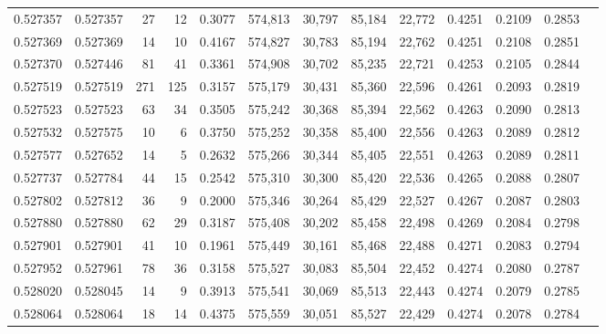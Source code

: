 \begin{tabular}{rrrrrrrrrrrrr}
0.527357 & 0.527357 &    27 &    12 &                                     0.3077 & 574,813 &  30,797 &  85,184 &  22,772 & 0.4251 & 0.2109 & 0.2853 \\
0.527369 & 0.527369 &    14 &    10 &                                     0.4167 & 574,827 &  30,783 &  85,194 &  22,762 & 0.4251 & 0.2108 & 0.2851 \\
0.527370 & 0.527446 &    81 &    41 &                                     0.3361 & 574,908 &  30,702 &  85,235 &  22,721 & 0.4253 & 0.2105 & 0.2844 \\
0.527519 & 0.527519 &   271 &   125 &                                     0.3157 & 575,179 &  30,431 &  85,360 &  22,596 & 0.4261 & 0.2093 & 0.2819 \\
0.527523 & 0.527523 &    63 &    34 &                                     0.3505 & 575,242 &  30,368 &  85,394 &  22,562 & 0.4263 & 0.2090 & 0.2813 \\
0.527532 & 0.527575 &    10 &     6 &                                     0.3750 & 575,252 &  30,358 &  85,400 &  22,556 & 0.4263 & 0.2089 & 0.2812 \\
0.527577 & 0.527652 &    14 &     5 &                                     0.2632 & 575,266 &  30,344 &  85,405 &  22,551 & 0.4263 & 0.2089 & 0.2811 \\
0.527737 & 0.527784 &    44 &    15 &                                     0.2542 & 575,310 &  30,300 &  85,420 &  22,536 & 0.4265 & 0.2088 & 0.2807 \\
0.527802 & 0.527812 &    36 &     9 &                                     0.2000 & 575,346 &  30,264 &  85,429 &  22,527 & 0.4267 & 0.2087 & 0.2803 \\
0.527880 & 0.527880 &    62 &    29 &                                     0.3187 & 575,408 &  30,202 &  85,458 &  22,498 & 0.4269 & 0.2084 & 0.2798 \\
0.527901 & 0.527901 &    41 &    10 &                                     0.1961 & 575,449 &  30,161 &  85,468 &  22,488 & 0.4271 & 0.2083 & 0.2794 \\
0.527952 & 0.527961 &    78 &    36 &                                     0.3158 & 575,527 &  30,083 &  85,504 &  22,452 & 0.4274 & 0.2080 & 0.2787 \\
0.528020 & 0.528045 &    14 &     9 &                                     0.3913 & 575,541 &  30,069 &  85,513 &  22,443 & 0.4274 & 0.2079 & 0.2785 \\
0.528064 & 0.528064 &    18 &    14 &                                     0.4375 & 575,559 &  30,051 &  85,527 &  22,429 & 0.4274 & 0.2078 & 0.2784 \\

\end{tabular}
